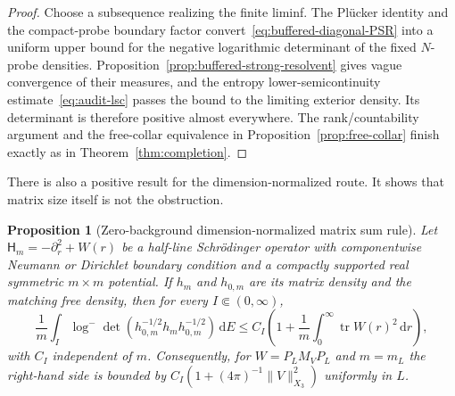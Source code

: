 \documentclass[11pt]{article}
\newcommand{\dd}{\,\mathrm d}
\DeclareMathOperator{\tr}{tr}
\newtheorem{proposition}[theorem]{Proposition}
\theoremstyle{definition}
\theoremstyle{remark}
\begin{document}
\begin{proof}
Choose a subsequence realizing the finite liminf.  The Pl\"ucker identity and
the compact-probe boundary factor convert~\eqref{eq:buffered-diagonal-PSR} into
a uniform upper bound for the negative logarithmic determinant of the fixed
$N$-probe densities.  Proposition~\ref{prop:buffered-strong-resolvent} gives
 vague convergence of their measures, and the entropy lower-semicontinuity
 estimate~\eqref{eq:audit-lsc} passes the bound to the limiting exterior
 density.  Its determinant is
therefore positive almost everywhere.  The rank/countability argument and the
free-collar equivalence in Proposition~\ref{prop:free-collar} finish exactly as
in Theorem~\ref{thm:completion}.
\end{proof}

There is also a positive result for the dimension-normalized route.  It shows
that matrix size itself is not the obstruction.

\begin{proposition}[Zero-background dimension-normalized matrix sum rule]
\label{prop:zero-background-NMSR}
Let
$\mathsf H_m=-\partial_r^2+W(r)$ be a half-line Schr\"odinger operator with
componentwise Neumann or Dirichlet boundary condition and a compactly supported
real symmetric $m\times m$ potential.  If $h_m$ and $h_{0,m}$ are its matrix
density and the matching free density, then for every
$I\Subset(0,\infty)$,
\begin{equation}
 \frac1m\int_I\log^-
 \det\!\left(h_{0,m}^{-1/2}h_mh_{0,m}^{-1/2}\right)\dd E
 \leq C_I\left(1+\frac1m\int_0^\infty\tr W(r)^2\dd r\right),
 \label{eq:zero-background-NMSR}
\end{equation}
with $C_I$ independent of $m$.  Consequently, for
$W=P_LM_VP_L$ and $m=m_L$ the right-hand side is bounded by
$C_I(1+(4\pi)^{-1}\|V\|_{X_3}^2)$ uniformly in $L$.
\end{proposition}
\end{document}

